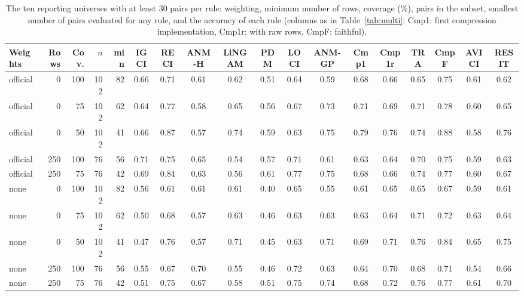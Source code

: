 \begin{table}[ht]
\caption{The ten reporting universes with at least $30$ pairs per rule: weighting, minimum number of rows, coverage (\%), pairs in the subset, smallest number of pairs evaluated for any rule, and the accuracy of each rule (columns as in Table~\ref{tab:multi}; Cmp1: first compression implementation, Cmp1r: with raw rows, CmpF: faithful).}
\label{tab:universes}
\tiny\setlength{\tabcolsep}{1.5pt}
\begin{tabular}{@{}lrrrrccccccccccccc@{}}
\toprule
Weights & Rows & Cov. & $n$ & min & IGCI & RECI & ANM-H & LiNGAM & PDM & LOCI & ANM-GP & Cmp1 & Cmp1r & TRA & CmpF & AVICI & RESIT\\
\midrule
official & 0 & 100 & 102 & 82 & 0.66 & 0.71 & 0.61 & 0.62 & 0.51 & 0.64 & 0.59 & 0.68 & 0.66 & 0.65 & 0.75 & 0.61 & 0.62\\
official & 0 & 75 & 102 & 62 & 0.64 & 0.77 & 0.58 & 0.65 & 0.56 & 0.67 & 0.73 & 0.71 & 0.69 & 0.71 & 0.78 & 0.60 & 0.65\\
official & 0 & 50 & 102 & 41 & 0.66 & 0.87 & 0.57 & 0.74 & 0.59 & 0.63 & 0.75 & 0.79 & 0.76 & 0.74 & 0.88 & 0.58 & 0.76\\
official & 250 & 100 & 76 & 56 & 0.71 & 0.75 & 0.65 & 0.54 & 0.57 & 0.71 & 0.61 & 0.63 & 0.64 & 0.70 & 0.75 & 0.59 & 0.63\\
official & 250 & 75 & 76 & 42 & 0.69 & 0.84 & 0.63 & 0.56 & 0.61 & 0.77 & 0.75 & 0.68 & 0.66 & 0.74 & 0.77 & 0.60 & 0.67\\
none & 0 & 100 & 102 & 82 & 0.56 & 0.61 & 0.61 & 0.61 & 0.40 & 0.65 & 0.55 & 0.61 & 0.65 & 0.65 & 0.67 & 0.59 & 0.61\\
none & 0 & 75 & 102 & 62 & 0.50 & 0.68 & 0.57 & 0.63 & 0.46 & 0.63 & 0.63 & 0.63 & 0.64 & 0.71 & 0.72 & 0.63 & 0.64\\
none & 0 & 50 & 102 & 41 & 0.47 & 0.76 & 0.57 & 0.71 & 0.45 & 0.63 & 0.71 & 0.69 & 0.71 & 0.76 & 0.84 & 0.65 & 0.75\\
none & 250 & 100 & 76 & 56 & 0.55 & 0.67 & 0.70 & 0.55 & 0.46 & 0.72 & 0.63 & 0.64 & 0.70 & 0.68 & 0.71 & 0.54 & 0.66\\
none & 250 & 75 & 76 & 42 & 0.51 & 0.75 & 0.67 & 0.58 & 0.51 & 0.75 & 0.74 & 0.68 & 0.72 & 0.76 & 0.77 & 0.61 & 0.70\\
\bottomrule
\end{tabular}
\end{table}

